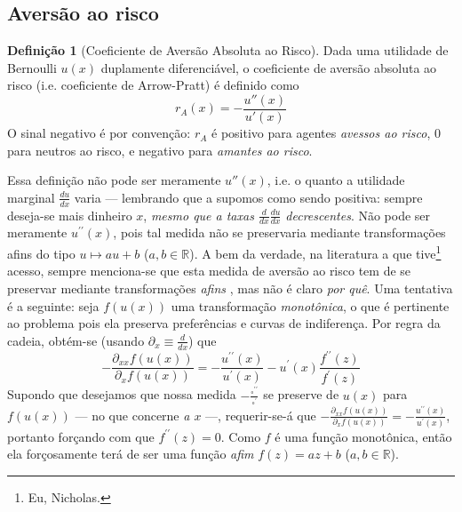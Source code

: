 \documentclass[12pt]{article}
\numberwithin{equation}{section}
\theoremstyle{plain}
\theoremstyle{definition}
\newtheorem{definition}[theorem]{Definição}
\theoremstyle{remark}
\begin{document}
\subsection{Aversão ao risco}
\begin{definition}[Coeficiente de Aversão Absoluta ao Risco]
  Dada uma utilidade de Bernoulli $u(x)$ duplamente diferenciável, o coeficiente de aversão absoluta ao risco (i.e. coeficiente de Arrow-Pratt) é definido como
  $$
  r_{A}(x) = -\frac{u''(x)}{u'(x)}
  $$
  O sinal negativo é por convenção: $r_{A}$ é positivo para agentes \textit{avessos ao risco}, $0$ para neutros ao risco, e negativo para \textit{amantes ao risco}.

  Essa definição não pode ser meramente $u''(x)$, i.e. o quanto a utilidade marginal $\frac{d u}{dx}$ varia --- lembrando que a supomos como sendo positiva: sempre deseja-se mais dinheiro $x$, \textit{mesmo que a taxas $\frac{d}{dx} \frac{du}{dx}$ decrescentes}. Não pode ser meramente $u^{\prime\prime}(x)$, pois tal medida não se preservaria mediante transformações afins do tipo $u \mapsto au + b$ ($a, b \in \mathbb{R}$). A bem da verdade, na literatura a que tive\footnote{Eu, Nicholas.} acesso, sempre menciona-se que esta medida de aversão ao risco tem de se preservar mediante transformações \textit{afins} \parencite{Arrow1974,Mas-Colell1995}, mas não é claro \textit{por quê}. Uma tentativa é a seguinte: seja $f(u(x))$ uma transformação \textit{monotônica}, o que é pertinente ao problema pois ela preserva preferências e curvas de indiferença. Por regra da cadeia, obtém-se (usando $\partial_x \equiv \frac{d}{dx}$) que
  $$-\frac{\partial_{xx}f(u(x))}{\partial_{x}f(u(x))} = -\frac{u^{\prime\prime}(x)}{u^{\prime}(x)} - u^{\prime}(x) \frac{f^{\prime\prime}(z)}{f^{\prime}(z)}
  $$
  Supondo que desejamos que nossa medida $-\frac{\square^{\prime\prime}}{\square^{\prime}}$ se preserve de $u(x)$ para $f(u(x))$ --- no que concerne \textit{a $x$} ---, requerir-se-á que $-\frac{\partial_{xx}f(u(x))}{\partial_{x}f(u(x))} = -\frac{u^{\prime\prime}(x)}{u^{\prime}(x)}$, portanto forçando com que $f^{\prime\prime}(z)= 0$. Como $f$ é uma função monotônica, então ela forçosamente terá de ser uma função \textit{afim} $f(z) = az+b$ ($a, b \in \mathbb{R}$).
 
\end{definition}
\end{document}
